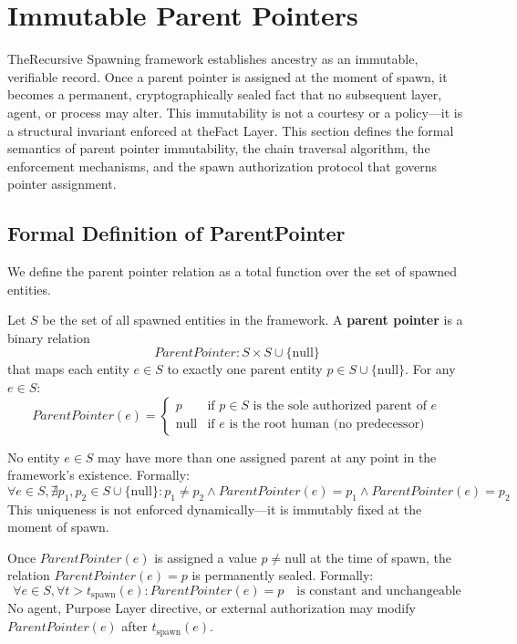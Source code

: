 \section{Immutable Parent Pointers}
\label{sec:immutable-parent-pointers}

TheRecursive Spawning framework establishes ancestry as an immutable, verifiable record. Once a parent pointer is assigned at the moment of spawn, it becomes a permanent, cryptographically sealed fact that no subsequent layer, agent, or process may alter. This immutability is not a courtesy or a policy—it is a structural invariant enforced at theFact Layer. This section defines the formal semantics of parent pointer immutability, the chain traversal algorithm, the enforcement mechanisms, and the spawn authorization protocol that governs pointer assignment.

\subsection{Formal Definition of ParentPointer}

We define the parent pointer relation as a total function over the set of spawned entities.

\begin{definition}
Let $S$ be the set of all spawned entities in the framework. A \textbf{parent pointer} is a binary relation
\[
ParentPointer : S \times S \cup \{\text{null}\}
\]
that maps each entity $e \in S$ to exactly one parent entity $p \in S \cup \{\text{null}\}$. For any $e \in S$:
\[
ParentPointer(e) = 
\begin{cases}
p & \text{if } p \in S \text{ is the sole authorized parent of } e \\
\text{null} & \text{if } e \text{ is the root human (no predecessor)}
\end{cases}
\]
\end{definition}

\begin{invariant}
No entity $e \in S$ may have more than one assigned parent at any point in the framework's existence. Formally:
\[
\forall e \in S, \nexists p_1, p_2 \in S \cup \{\text{null}\} : p_1 \neq p_2 \land ParentPointer(e) = p_1 \land ParentPointer(e) = p_2
\]
This uniqueness is not enforced dynamically—it is immutably fixed at the moment of spawn.
\end{invariant}

\begin{invariant}
Once $ParentPointer(e)$ is assigned a value $p \neq \text{null}$ at the time of spawn, the relation $ParentPointer(e) = p$ is permanently sealed. Formally:
\[
\forall e \in S, \forall t > t_{\text{spawn}}(e) : ParentPointer(e) = p \quad \text{is constant and unchangeable}
\]
No agent, Purpose Layer directive, or external authorization may modify $ParentPointer(e)$ after $t_{\text{spawn}}(e)$.
\end{invariant}

